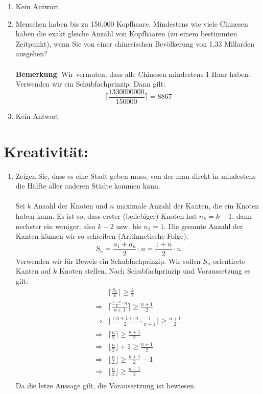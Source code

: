 \begin{enumerate}[label=(\alph*)]
        \item Kein Antwort
        
        \item Menschen haben bis zu 150.000 Kopfhaare. Mindestens wie viele Chinesen haben die
		exakt gleiche Anzahl von Kopfhaaren (zu einem bestimmten Zeitpunkt), wenn Sie von
		einer chinesischen Bevölkerung von 1,33 Millarden ausgehen?\\\\
		\textbf{Bemerkung}: Wir vermuten, dass alle Chinesen mindestens 1 Haar haben.\\
		Verwenden wir ein Schubfachprinzip. Dann gilt:
		\[\bigg\lceil\frac{1330000000}{150000}\bigg\rceil = 8867\]
		
        \item Kein Antwort
    \end{enumerate}
    \section*{Kreativit\"at:}
    \begin{enumerate}[label=(\alph*)]
    	\item Zeigen Sie, dass es eine Stadt geben muss, von der man direkt in mindestens die Hälfte
		aller anderen Städte kommen kann.\\\\
		Sei $k$ Anzahl der Knoten und $n$ maximale Anzahl der Kanten, die ein Knoten haben kann. 
		Es ist so, dass erster (beliebiger) Knoten hat $n_k = k-1$, dann nechster ein weniger, 
		also $k-2$ usw. bis $n_1 = 1$. 
		Die gesamte Anzahl der Kanten k\"onnen wir so schreiben (Arithmetische Folge): 
		\[S_n = \frac{a_1+a_n}{2}\cdot n = \frac{1+n}{2}\cdot n\]
		Verwenden wir f\"ur Beweis ein Schubfachprinzip. Wir sollen $S_n$ orientirete Kanten auf $k$ 
		Knoten stellen. Nach Schubfachprinzip und Voraussetzung es gilt: 
		\begin{align*}
			&\bigg\lceil\frac{S_n}{k}\bigg\rceil \geq \frac{k}{2} \\
			\Rightarrow &\bigg\lceil\frac{\frac{1+n}{2}\cdot n}{n+1}\bigg\rceil \geq \frac{n+1}{2}\\
			\Rightarrow &\bigg\lceil\frac{(n+1)\cdot n}{2} \cdot \frac{1}{n+1}\bigg\rceil \geq \frac{n+1}{2}\\
			\Rightarrow &\bigg\lceil\frac{n}{2}\bigg\rceil \geq \frac{n+1}{2}\\
			\Rightarrow &\bigg\lfloor\frac{n}{2}\bigg\rfloor + 1 \geq \frac{n+1}{2}\\
			\Rightarrow &\bigg\lfloor\frac{n}{2}\bigg\rfloor \geq \frac{n+1}{2} - 1\\
			\Rightarrow &\bigg\lfloor\frac{n}{2}\bigg\rfloor \geq \frac{n-1}{2}\\
		\end{align*}
		Da die letze Aussage gilt, die Voraussetzung ist bewiesen.	
    \end{enumerate}
